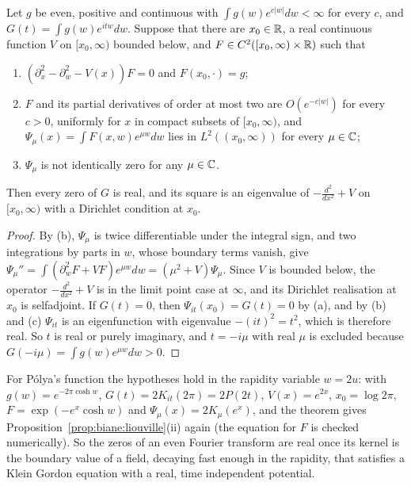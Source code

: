 \begin{theorem}\label{thm:biane:kg}
Let $g$ be even, positive and continuous with $\int g(w)e^{c|w|}dw<\infty$ for every $c$, and $G(t)=\int g(w)e^{itw}dw$. Suppose that there are $x_0\in\mathbb{R}$, a real continuous function $V$ on $[x_0,\infty)$ bounded below, and $F\in C^2([x_0,\infty)\times\mathbb{R})$ such that
\begin{enumerate}
\item[(a)] $(\partial_x^2-\partial_w^2-V(x))F=0$ and $F(x_0,\cdot)=g$;
\item[(b)] $F$ and its partial derivatives of order at most two are $O(e^{-c|w|})$ for every $c>0$, uniformly for $x$ in compact subsets of $[x_0,\infty)$, and $\Psi_\mu(x)=\int F(x,w)e^{\mu w}dw$ lies in $L^2((x_0,\infty))$ for every $\mu\in\mathbb{C}$;
\item[(c)] $\Psi_\mu$ is not identically zero for any $\mu\in\mathbb{C}$.
\end{enumerate}
Then every zero of $G$ is real, and its square is an eigenvalue of $-\frac{d^2}{dx^2}+V$ on $[x_0,\infty)$ with a Dirichlet condition at $x_0$.
\end{theorem}

\begin{proof}
By (b), $\Psi_\mu$ is twice differentiable under the integral sign, and two integrations by parts in $w$, whose boundary terms vanish, give $\Psi_\mu''=\int(\partial_w^2F+VF)e^{\mu w}dw=(\mu^2+V)\Psi_\mu$. Since $V$ is bounded below, the operator $-\frac{d^2}{dx^2}+V$ is in the limit point case at $\infty$, and its Dirichlet realisation at $x_0$ is selfadjoint. If $G(t)=0$, then $\Psi_{it}(x_0)=G(t)=0$ by (a), and by (b) and (c) $\Psi_{it}$ is an eigenfunction with eigenvalue $-(it)^2=t^2$, which is therefore real. So $t$ is real or purely imaginary, and $t=-i\mu$ with real $\mu$ is excluded because $G(-i\mu)=\int g(w)e^{\mu w}dw>0$.
\end{proof}

For P\'olya's function the hypotheses hold in the rapidity variable $w=2u$: with $g(w)=e^{-2\pi\cosh w}$, $G(t)=2K_{it}(2\pi)=2P(2t)$, $V(x)=e^{2x}$, $x_0=\log2\pi$, $F=\exp(-e^x\cosh w)$ and $\Psi_\mu(x)=2K_\mu(e^x)$, and the theorem gives Proposition~\ref{prop:biane:liouville}(ii) again (the equation for $F$ is checked numerically). So the zeros of an even Fourier transform are real once its kernel is the boundary value of a field, decaying fast enough in the rapidity, that satisfies a Klein Gordon equation with a real, time independent potential.

